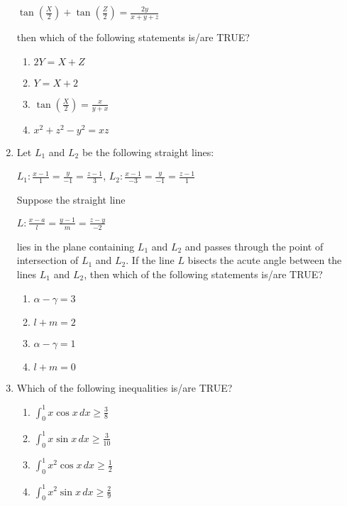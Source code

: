 \documentclass{article}
\begin{document}
\begin{enumerate}
\begin{center}
    $\tan\left(\frac{X}{2}\right) + \tan\left(\frac{Z}{2}\right) = \frac{2y}{x + y + z}$
\end{center}

    then which of the following statements is/are TRUE?

    \begin{enumerate}
        \item  $2Y = X + Z$
        \item  $Y = X + 2$
        \item  $\tan\left(\frac{X}{2}\right) = \frac{x}{y + x}$
        \item  $x^2 + z^2 - y^2 = xz$
    \end{enumerate}

\item  Let $L_1$ and $L_2$ be the following straight lines:

\begin{center}
    $L_1 :\frac{x - 1}{1} = \frac{y}{-1} = \frac{z - 1}{3}$, \quad 
    $L_2 : \frac{x - 1}{-3} = \frac{y}{-1} = \frac{z - 1}{1}$
\end{center}

    Suppose the straight line 

\begin{center}
    $L : \frac{x - a}{l} = \frac{y - 1}{m} = \frac{z - y}{-2}$
\end{center}

    lies in the plane containing $L_1$ and $L_2$ and passes through the point of intersection of $L_1$ and $L_2$. If the line $L$ bisects the acute angle between the lines $L_1$ and $L_2$, then which of the following statements is/are TRUE?

    \begin{enumerate}
        \item  $\alpha - \gamma = 3$
        \item  $l + m = 2$
        \item  $\alpha - \gamma = 1$
        \item  $l + m = 0$
    \end{enumerate}

\item  Which of the following inequalities is/are TRUE?

    \begin{enumerate}
        \item  $\int_0^1 x \cos x \,dx \geq \frac{3}{8}$
        \item  $\int_0^1 x \sin x \,dx \geq \frac{3}{10}$
        \item  $\int_0^1 x^2 \cos x \,dx \geq \frac{1}{2}$
        \item  $\int_0^1 x^2 \sin x \,dx \geq \frac{2}{9}$
    \end{enumerate}


\end{enumerate}
\end{document}

